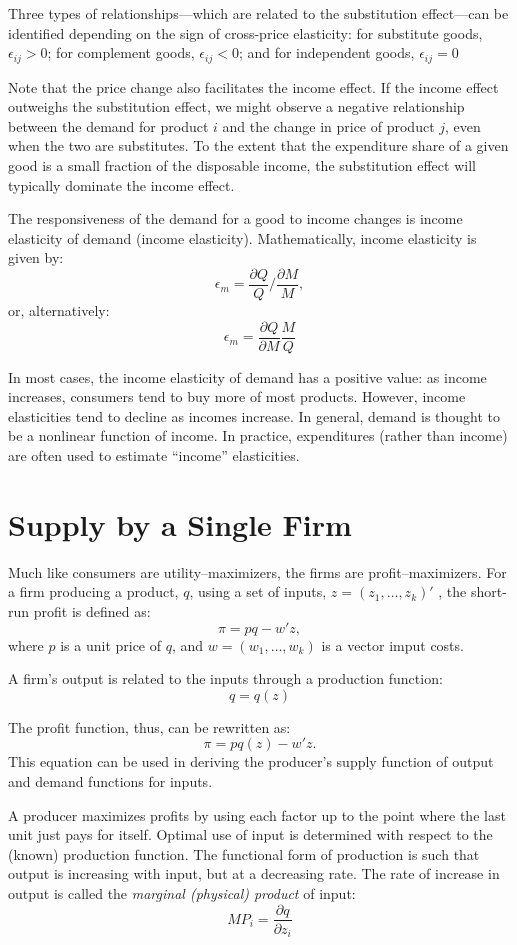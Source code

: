 \documentclass[]{book}
\begin{document}
Three types of relationships---which are related to the substitution
effect---can be identified depending on the sign of cross-price
elasticity: for substitute goods, \(\epsilon_{ij} > 0\); for complement
goods, \(\epsilon_{ij} < 0\); and for independent goods,
\(\epsilon_{ij} = 0\)

Note that the price change also facilitates the income effect. If the
income effect outweighs the substitution effect, we might observe a
negative relationship between the demand for product \(i\) and the
change in price of product \(j\), even when the two are substitutes. To
the extent that the expenditure share of a given good is a small
fraction of the disposable income, the substitution effect will
typically dominate the income effect.

The responsiveness of the demand for a good to income changes is income
elasticity of demand (income elasticity). Mathematically, income
elasticity is given by:
\[\epsilon_{m} = \frac{\partial Q}{Q}/\frac{\partial M}{M},\] or,
alternatively:
\[\epsilon_{m} = \frac{\partial Q}{\partial M}\frac{M}{Q}\]

In most cases, the income elasticity of demand has a positive value: as
income increases, consumers tend to buy more of most products. However,
income elasticities tend to decline as incomes increase. In general,
demand is thought to be a nonlinear function of income. In practice,
expenditures (rather than income) are often used to estimate ``income''
elasticities.

\section{Supply by a Single Firm}\label{supply-by-a-single-firm}

Much like consumers are utility--maximizers, the firms are
profit--maximizers. For a firm producing a product, \(q\), using a set
of inputs, \(z=(z_1,\ldots,z_k)'\) , the short-run profit is defined as:
\[\pi = pq-w'z,\] where \(p\) is a unit price of \(q\), and
\(w=(w_1,\ldots,w_k)\) is a vector imput costs.

A firm's output is related to the inputs through a production function:
\[q = q(z)\]

The profit function, thus, can be rewritten as: \[\pi = pq(z)-w'z.\]
This equation can be used in deriving the producer's supply function of
output and demand functions for inputs.

A producer maximizes profits by using each factor up to the point where
the last unit just pays for itself. Optimal use of input is determined
with respect to the (known) production function. The functional form of
production is such that output is increasing with input, but at a
decreasing rate. The rate of increase in output is called the
\emph{marginal (physical) product} of input:
\[MP_i=\frac{\partial q}{\partial z_i}\]
\end{document}
